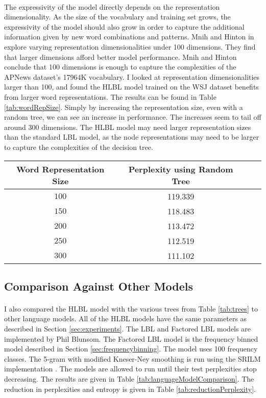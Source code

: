 \paragraph{}
The expressivity of the model directly depends on the representation dimensionality. As the size of the vocabulary and training set grows, the expressivity of the model should also grow in order to capture the additional information given by new word combinations and patterns. Mnih and Hinton in \cite{MnihHinton2009} explore varying representation dimensionalities under 100 dimensions. They find that larger dimensions afford better model performance. Mnih and Hinton conclude that 100 dimensions is enough to capture the complexities of the APNews dataset's 17964K vocabulary. I looked at representation dimensionalities larger than 100, and found the HLBL model trained on the WSJ dataset benefits from larger word representations. The results can be found in Table \ref{tab:wordRepSize}. Simply by increasing the representation size, even with a random tree, we can see an increase in performance. The increases seem to tail off around 300 dimensions.  The HLBL model may need larger representation sizes than the standard LBL model, as the node representations may need to be larger to capture the complexities of the decision tree.


\begin{table*} \centering
{}
\begin{tabular}{@{}cccc@{}}\toprule
Word Representation Size & Perplexity using Random Tree\\ 
\midrule
$100$ & 119.339 \\
$150$ & 118.483 \\
$200$ & 113.472 \\
$250$ & 112.519 \\
$300$ & 111.102 \\
\bottomrule
\end{tabular}
\caption{The effect of word representation size on test perplexity.}
\label{tab:wordRepSize}
\end{table*}

\subsection{Comparison Against Other Models}
\paragraph{}
I also compared the HLBL model with the various trees from Table \ref{tab:trees} to other language models. All of the HLBL models have the same parameters as described in Section \ref{sec:experiments}. The LBL and Factored LBL models are implemented by Phil Blunsom. The Factored LBL model is the frequency binned model described in Section \ref{sec:frequencybinning}. The model uses 100 frequency classes. The 5-gram with modified Kneser-Ney smoothing is run using the SRILM implementation \cite{Alumae2010}.
The models are allowed to run until their test perplexities stop decreasing. The results are given in Table \ref{tab:languageModelComparison}. The reduction in perplexities and entropy is given in Table \ref{tab:reductionPerplexity}. 

